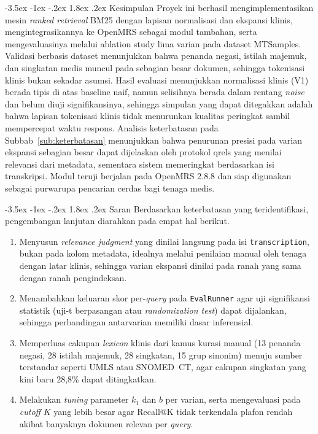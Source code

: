 \documentclass[a4paper,12pt]{article}
\makeatletter
\renewcommand{\section}{\@startsection{section}{1}{\z@}%
  {-3.5ex \@plus -1ex \@minus -.2ex}%
  {1.8ex \@plus .2ex}%
  {\normalfont\normalsize\bfseries}}
\makeatother
\begin{document}
\section{Kesimpulan}
Proyek ini berhasil mengimplementasikan mesin \textit{ranked retrieval} BM25 dengan lapisan normalisasi dan ekspansi klinis, mengintegrasikannya ke OpenMRS sebagai modul tambahan, serta mengevaluasinya melalui ablation study lima varian pada dataset MTSamples. Validasi berbasis dataset menunjukkan bahwa penanda negasi, istilah majemuk, dan singkatan medis muncul pada sebagian besar dokumen, sehingga tokenisasi klinis bukan sekadar asumsi. Hasil evaluasi menunjukkan normalisasi klinis (V1) berada tipis di atas baseline naif, namun selisihnya berada dalam rentang \textit{noise} dan belum diuji signifikansinya, sehingga simpulan yang dapat ditegakkan adalah bahwa lapisan tokenisasi klinis tidak menurunkan kualitas peringkat sambil mempercepat waktu respons. Analisis keterbatasan pada Subbab~\ref{sub:keterbatasan} menunjukkan bahwa penurunan presisi pada varian ekspansi sebagian besar dapat dijelaskan oleh protokol qrels yang menilai relevansi dari metadata, sementara sistem memeringkat berdasarkan isi transkripsi. Modul teruji berjalan pada OpenMRS 2.8.8 dan siap digunakan sebagai purwarupa pencarian cerdas bagi tenaga medis.

\section{Saran}
Berdasarkan keterbatasan yang teridentifikasi, pengembangan lanjutan diarahkan pada empat hal berikut.
\begin{enumerate}
    \item Menyusun \textit{relevance judgment} yang dinilai langsung pada isi \texttt{transcription}, bukan pada kolom metadata, idealnya melalui penilaian manual oleh tenaga dengan latar klinis, sehingga varian ekspansi dinilai pada ranah yang sama dengan ranah pengindeksan.
    \item Menambahkan keluaran skor per-\textit{query} pada \texttt{EvalRunner} agar uji signifikansi statistik (uji-t berpasangan atau \textit{randomization test}) dapat dijalankan, sehingga perbandingan antarvarian memiliki dasar inferensial.
    \item Memperluas cakupan \textit{lexicon} klinis dari kamus kurasi manual (13 penanda negasi, 28 istilah majemuk, 28 singkatan, 15 grup sinonim) menuju sumber terstandar seperti UMLS atau SNOMED~CT, agar cakupan singkatan yang kini baru 28,8\% dapat ditingkatkan.
    \item Melakukan \textit{tuning} parameter $k_1$ dan $b$ per varian, serta mengevaluasi pada \textit{cutoff} $K$ yang lebih besar agar Recall@K tidak terkendala plafon rendah akibat banyaknya dokumen relevan per \textit{query}.
\end{enumerate}

\clearpage


\end{document}
